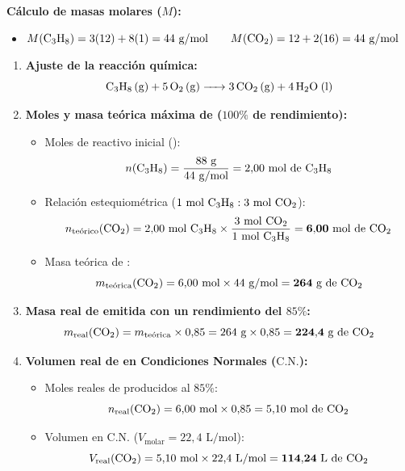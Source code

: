 \documentclass[11pt,a4paper]{article}
\begin{document}
\vspace{0.3cm}
\noindent\textbf{Cálculo de masas molares ($M$):}
\begin{itemize}[leftmargin=1.5em, itemsep=2pt]
    \item $M(\ce{C3H8}) = 3(12) + 8(1) = 44\text{ g/mol} \qquad M(\ce{CO2}) = 12 + 2(16) = 44\text{ g/mol}$
\end{itemize}

\vspace{0.2cm}
\begin{enumerate}[label=\textbf{\alph*)}, leftmargin=2em, itemsep=8pt]
    \item \textbf{Ajuste de la reacción química:}
    \[
    \ce{C3H8 (g) + 5 O2 (g) -> 3 CO2 (g) + 4 H2O (l)}
    \]

    \item \textbf{Moles y masa teórica máxima de  ($100\%$ de rendimiento):}
    \begin{itemize}[leftmargin=1.5em, itemsep=2pt]
        \item Moles de reactivo inicial ():
        \[
        n(\ce{C3H8}) = \frac{88\text{ g}}{44\text{ g/mol}} = 2{,}00\text{ mol de \ce{C3H8}}
        \]
        \item Relación estequiométrica ($1\text{ mol \ce{C3H8}} : 3\text{ mol \ce{CO2}}$):
        \[
        n_{\text{teórico}}(\ce{CO2}) = 2{,}00\text{ mol \ce{C3H8}} \times \frac{3\text{ mol \ce{CO2}}}{1\text{ mol \ce{C3H8}}} = \mathbf{6{,}00\text{ mol de \ce{CO2}}}
        \]
        \item Masa teórica de :
        \[
        m_{\text{teórica}}(\ce{CO2}) = 6{,}00\text{ mol} \times 44\text{ g/mol} = \mathbf{264\text{ g de \ce{CO2}}}
        \]
    \end{itemize}

    \item \textbf{Masa real de  emitida con un rendimiento del $85\%$:}
    \[
    m_{\text{real}}(\ce{CO2}) = m_{\text{teórica}} \times 0{,}85 = 264\text{ g} \times 0{,}85 = \mathbf{224{,}4\text{ g de \ce{CO2}}}
    \]

    \item \textbf{Volumen real de  en Condiciones Normales ($\text{C.N.}$):}
    \begin{itemize}[leftmargin=1.5em, itemsep=2pt]
        \item Moles reales de  producidos al $85\%$:
        \[
        n_{\text{real}}(\ce{CO2}) = 6{,}00\text{ mol} \times 0{,}85 = 5{,}10\text{ mol de \ce{CO2}}
        \]
        \item Volumen en C.N. ($V_{\text{molar}} = 22{,}4\text{ L/mol}$):
        \[
        V_{\text{real}}(\ce{CO2}) = 5{,}10\text{ mol} \times 22{,}4\text{ L/mol} = \mathbf{114{,}24\text{ L de \ce{CO2}}}
        \]
    \end{itemize}
\end{enumerate}
\end{document}
